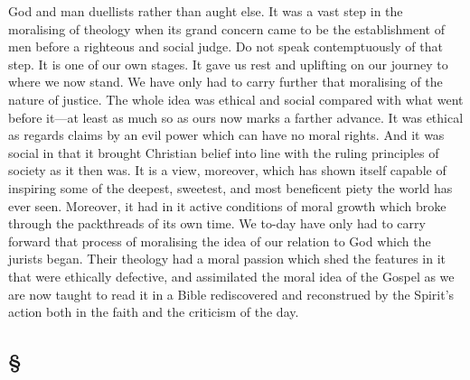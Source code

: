 \documentclass[draft]{ptfdoc}
\begin{document}
God and man duellists rather than aught else. 
It was a vast step in the moralising of theology 
when its grand concern came to be the establishment 
of men before a righteous and social 
judge. Do not speak contemptuously of that 
step. It is one of our own stages. It gave us 
rest and uplifting on our journey to where we 
now stand. We have only had to carry further 
that moralising of the nature of justice. The 
whole idea was ethical and social compared 
with what went before it---at least as much so 
as ours now marks a farther advance. It was 
ethical as regards claims by an evil power which 
can have no moral rights. And it was social 
in that it brought Christian belief into line 
with the ruling principles of society as it then 
was. It is a view, moreover, which has shown 
itself capable of inspiring some of the deepest, 
sweetest, and most beneficent piety the world 
has ever seen. Moreover, it had in it active 
conditions of moral growth which broke 
through the packthreads of its own time. 
We to-day have only had to carry forward 
that process of moralising the idea of our relation 
to God which the jurists began. Their 
theology had a moral passion which shed the 
features in it that were ethically defective, and 
assimilated the moral idea of the Gospel as 
we are now taught to read it in a Bible rediscovered 
and reconstrued by the Spirit's action 
both in the faith and the criticism of the day. 

\subsection*{
\S
}
\end{document}
